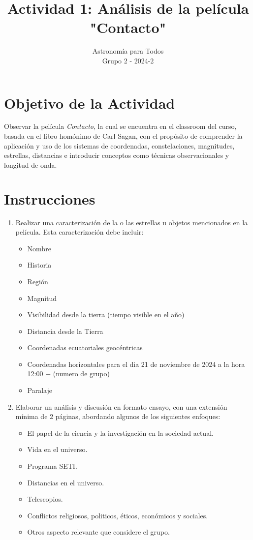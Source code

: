 \documentclass[12pt]{article}
\title{Actividad 1: Análisis de la película "Contacto"}
\author{Astronomía para Todos \\ Grupo 2 - 2024-2}
\date{}
\begin{document}
\maketitle

\section*{Objetivo de la Actividad}

Observar la película \textit{Contacto}, la cual se encuentra en el classroom del curso, basada en el libro homónimo de Carl Sagan, con el propósito de comprender la aplicación y uso de los sistemas de coordenadas, constelaciones, magnitudes, estrellas, distancias e introducir conceptos como técnicas observacionales y longitud de onda.

\section*{Instrucciones}

\begin{enumerate}
    \item Realizar una caracterización de la o las estrellas u objetos mencionados en la película. Esta caracterización debe incluir:
    \begin{itemize}
        \item Nombre
        \item Historia
        \item Región
        \item Magnitud
        \item Visibilidad desde la tierra (tiempo visible en el año)
        \item Distancia desde la Tierra
        \item Coordenadas ecuatoriales geocéntricas
        \item Coordenadas horizontales para el dia 21 de noviembre de 2024 a la hora 12:00 + (numero de grupo)
        \item Paralaje
    \end{itemize}
    \item Elaborar un análisis y discusión en formato ensayo, con una extensión mínima de 2 páginas, abordando algunos de los siguientes enfoques:
    \begin{itemize}
        \item El papel de la ciencia y la investigación en la sociedad actual.
        \item Vida en el universo.
        \item Programa SETI.
        \item Distancias en el universo.
        \item Telescopios.
        \item Conflictos religiosos, politicos, éticos, económicos y sociales.
        \item Otros aspecto relevante que considere el grupo.
    \end{itemize}
\end{enumerate}
\end{document}
